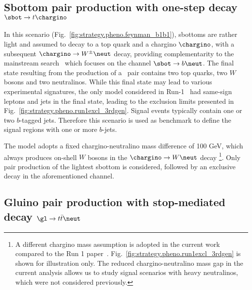 \subsection*{Sbottom pair production with one-step decay $\sbot\to t\chargino$}
\label{subsec:signals_sbot}

In this scenario (Fig.~\ref{fig:strategy.pheno.feynman_b1b1}), sbottoms are rather light and assumed to decay to a top quark and a chargino $\chargino$, 
with a subsequent $\chargino\to W^\pm\neut$ decay, 
providing complementarity to the mainstream search~\cite{ATLAS-CONF-2015-066} which focuses on the channel $\sbot\to b\neut$. 
The final state resulting from the production of a \sbsb\ pair contains two top quarks, two $W$ bosons and two neutralinos. 
While this final state may lead to various experimental signatures, 
the only model considered in Run-1~\cite{SUSY-2014-06} had
same-sign leptons and jets in the final state, leading to the exclusion limits presented in Fig.~\ref{fig:strategy.pheno.run1excl_3rdgen}. 
Signal events typically contain one or two $b$-tagged jets. 
Therefore this scenario is used as benchmark to define the signal regions with one or more $b$-jets. 

The model adopts a fixed chargino-neutralino mass difference of 100 GeV, 
which always produces on-shell $W$ bosons in the $\chargino\to W\neut$ decay
\footnote{A different chargino mass assumption is adopted in the current 
work compared to the Run 1 paper~\cite{SUSY-2014-06}.
Fig.~\ref{fig:strategy.pheno.run1excl_3rdgen} is shown for illustration only.
The reduced chargino-neutralino mass gap in the current analysis 
allows us to study signal scenarios with heavy neutralinos, which were not considered previously.}.
Only pair production of the lightest sbottom is considered, followed by an exclusive decay in the aforementioned channel. 


\subsection*{Gluino pair production with stop-mediated decay $\gl\to t\bar t\neut$}
\label{subsec:signals_gtt}

